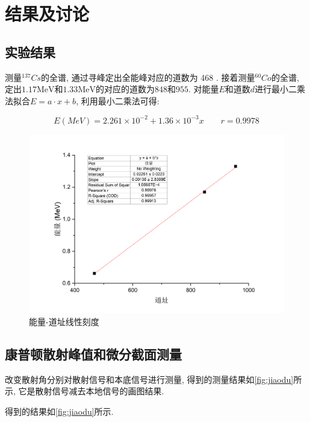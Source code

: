 \documentclass[font=default]{mpltx}
\begin{document}
\section{结果及讨论}

  \subsection{实验结果}

    测量${^{137}Cs}$的全谱, 通过寻峰定出全能峰对应的道数为 468 . 接着测量${^{60}Co}$的全谱, 定出$1.17\text{MeV}$和$1.33\text{MeV}$的对应的道数为$848$和$955$.
    对能量$E$和道数$d$进行最小二乘法拟合$E = a \cdot x + b $, 
    利用最小二乘法可得: 

	  \begin{equation}
		  E(MeV)=2.261 \times 10^{-2}+1.36 \times 10^{-3} x\qquad r=0.9978
	  \end{equation}

    \begin{figure}[htbp]
      \centering
      \includegraphics[width=0.85\linewidth]{fig/nihe.png}
      \caption{能量-道址线性刻度}
      \label{fig:nihe}
    \end{figure}

    \subsection{康普顿散射峰值和微分截面测量}

    改变散射角分别对散射信号和本底信号进行测量,  得到的测量结果如\autoref{fig:jiaodu}所示, 它是散射信号减去本地信号的画图结果. 
    
    得到的结果如\autoref{fig:jiaodu}所示.
\end{document}
